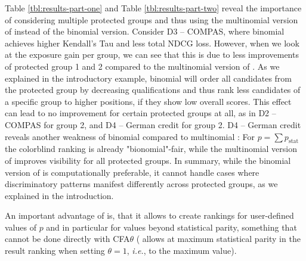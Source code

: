  Table \ref{tbl:results-part-one} and Table \ref{tbl:results-part-two} reveal the importance of considering multiple protected groups and thus using the multinomial version of \algoFAIR instead of the binomial version. 
%
Consider D3 -- COMPAS, where binomial \algoFAIR achieves higher Kendall's Tau and less total NDCG loss. 
%
However, when we look at the exposure gain per group, we can see that this is due to less improvements of protected group 1 and 2 compared to the multinomial version of \algoFAIR. 
%
As we explained in the introductory example, binomial \algoFAIR will order all candidates from the protected group by decreasing qualifications and thus rank less candidates of a specific group to higher positions, if they show low overall scores.
%
This effect can lead to no improvement for certain protected groups at all, as in D2 -- COMPAS for group 2, and D4 -- German credit for group 2. 
%
D4 -- German credit reveals another weakness of binomial \algoFAIR compared to multinomial \algoFAIR: For $p=\sum p_{\text{stat}}$ the colorblind ranking is already "bionomial"-fair, while the multinomial version of \algoFAIR improves visibility for all protected groups. 
%
%
In summary, while the binomial version of \algoFAIR is computationally preferable, it cannot handle cases where discriminatory patterns manifest differently across protected groups, as we explained in the introduction. 

%
An important advantage of \algoFAIR is, that it allows to create rankings for user-defined values of $p$ and in particular for values beyond statistical parity, something that cannot be done directly with CFA$\theta$ (\citet{zehlike2020matching} allows at maximum statistical parity in the result ranking when setting $\theta=1$, {\it i.e.}, to the maximum value).

